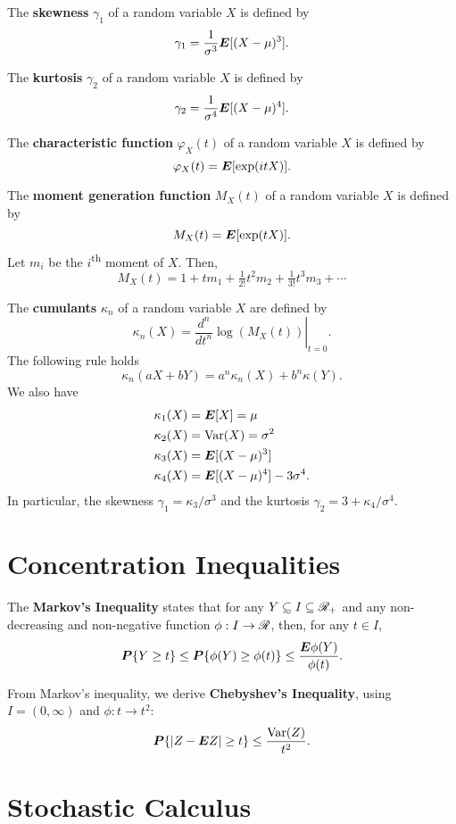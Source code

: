 \begin{outline}
\1 The \textbf{skewness} $\gamma_1$ of a random variable $X$ is defined by
\[
  \gamma_1 = \frac{1}{\sigma^3}\bm E[(X-\mu)^3].
\]

\1 The \textbf{kurtosis} $\gamma_2$ of a random variable $X$ is defined by
\[
  \gamma_2 = \frac{1}{\sigma^4}\bm E[(X-\mu)^4].
\]

\1 The \textbf{characteristic function} $\varphi_X(t)$ of a random variable $X$ is defined by
\[
  \varphi_X(t) = \bm E[\exp(itX)].
\]

\1 The \textbf{moment generation function} $M_X(t)$ of a random variable $X$ is defined by
\[
  M_X(t) = \bm E[\exp(tX)].
\]
Let $m_i$ be the $i$\textsuperscript{th} moment of $X$. Then,
\[
  M_X(t) = 1+tm_1 + \tfrac{1}{2!}t^2m_2 + \tfrac{1}{3!} t^3m_3 + \cdots
\]

\1 The \textbf{cumulants} $\kappa_n$ of a random variable $X$ are defined by
\[
  \kappa_n(X) = \left.\frac{d^n}{dt^n}\log(M_X(t))\right\vert_{t=0}.
\]
The following rule holds
\[
  \kappa_n(aX + bY) = a^n\kappa_n(X) + b^n\kappa(Y).
\]
We also have
\begin{align*}
  \kappa_1(X) &= \bm E[X]=\mu\\
  \kappa_2(X) &= \operatorname{Var}(X) = \sigma^2\\
  \kappa_3(X) &= \bm E[(X-\mu)^3]\\
  \kappa_4(X) &= \bm E[(X-\mu)^4] - 3\sigma^4.
\end{align*}
In particular, the skewness $\gamma_1 = \kappa_3/\sigma^3$ and the kurtosis $\gamma_2 =
3+\kappa_4/\sigma^4$. 
\end{outline}


\section{Concentration Inequalities}
\begin{outline}
\1 The \textbf{Markov's Inequality} states that for any $Y\subsim I\subseteq\real_{+}$ and any
non-decreasing and non-negative function $\phi:I\to\mathscr{R}$, then, for any $t\in I$,
\[
  \bm P\{Y\geq t\}\leq\bm P\{\phi(Y)\geq\phi(t)\}\leq\frac{\bm E\phi(Y)}{\phi(t)}.
\]

\1 From Markov's inequality, we derive \textbf{Chebyshev's Inequality}, using
$I=(0,\infty)$ and $\phi:t\to t^2$:
\[
  \bm P\{|Z-\bm E Z|\geq t\} \leq \frac{\operatorname{Var}(Z)}{t^2}.
\]
\end{outline}


\section{Stochastic Calculus}

